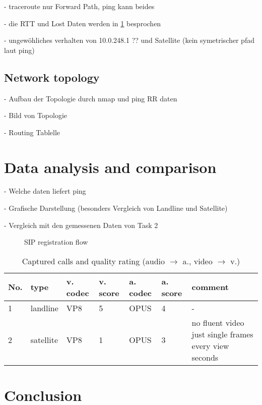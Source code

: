 \documentclass[parskip=full]{scrartcl}
\begin{document}
- traceroute nur Forward Path, ping kann beides

- die RTT und Lost Daten werden in \ref{sec:data} besprochen

- ungewöhliches verhalten von 10.0.248.1 ?? und Satellite (kein symetrischer pfad laut ping)

\subsection{Network topology}

- Aufbau der Topologie durch nmap und ping RR daten

- Bild von Topologie 

- Routing Tablelle


\section{Data analysis and comparison} \label{sec:data}
- Welche daten liefert ping

- Grafische Darstellung (besonders Vergleich von Landline und Satellite)

- Vergleich mit den gemessenen Daten von Task 2



\begin{figure}[!ht]
	\centering %
	\caption{SIP registration flow} 
	\label{fig:SIP Registrar} %
\end{figure}

\begin{table}[hb]
	\centering
	\begin{tabular}{|l|l|l|l|l|l|p{}|}
		\hline
		\textbf{No.} & \textbf{type} & \textbf{v. codec} &\textbf{v. score} & \textbf{a. codec} & \textbf{a. score} & \textbf{comment} \\ 
		\hline
		1 & landline & VP8 &5& OPUS &4&- \\
		\hline
		2 & satellite & VP8 &1 &  OPUS &3&no fluent video just single frames every view seconds\\
		\hline
	\end{tabular}
	\caption{Captured calls and quality rating (audio $\rightarrow$ a., video $\rightarrow$ v.)}
	\label{tab:capture}
\end{table}



\newpage
\section{Conclusion}


\printbibliography
\end{document}
